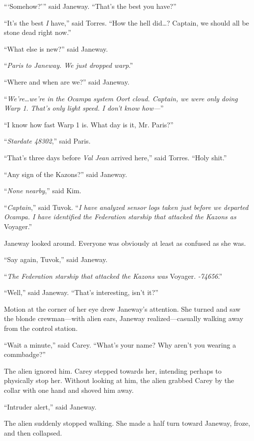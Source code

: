 \documentclass[twoside,letterpaper,12pt]{memoir}
\begin{document}
```Somehow?''' said Janeway. ``That's the best you have?''

``It's the best \textit{I} have,'' said Torres. ``How the hell did\ldots ? Captain, we should all be stone dead right now.''

``What else is new?'' said Janeway.

``\textit{Paris to Janeway. We just dropped warp}.''

``Where and when are we?'' said Janeway.

``\textit{We're\ldots we're in the Ocampa system Oort cloud. Captain, we were only doing Warp 1. That's only light speed. I don't know how---}''

``I know how fast Warp 1 is. What day is it, Mr. Paris?''

``\textit{Stardate 48302},'' said Paris.

``That's three days before \textit{Val Jean} arrived here,'' said Torres. ``Holy shit.''

``Any sign of the Kazons?'' said Janeway.

``\textit{None nearby},'' said Kim.

``\textit{Captain},'' said Tuvok. ``\textit{I have analyzed sensor logs taken just before we departed Ocampa. I have identified the Federation starship that attacked the Kazons as}  Voyager.''

Janeway looked around. Everyone was obviously at least as confused as she was.

``Say again, Tuvok,'' said Janeway.

``\textit{The Federation starship that attacked the Kazons was}  Voyager. \textit{-74656}.''

``Well,'' said Janeway. ``That's interesting, isn't it?''

Motion at the corner of her eye drew Janeway's attention. She turned and saw the blonde crewman---with alien ears, Janeway realized---casually walking away from the control station.

``Wait a minute,'' said Carey. ``What's your name? Why aren't you wearing a commbadge?''

The alien ignored him. Carey stepped towards her, intending perhaps to physically stop her. Without looking at him, the alien grabbed Carey by the collar with one hand and shoved him away.

``Intruder alert,'' said Janeway.

The alien suddenly stopped walking. She made a half turn toward Janeway, froze, and then collapsed.
\end{document}
